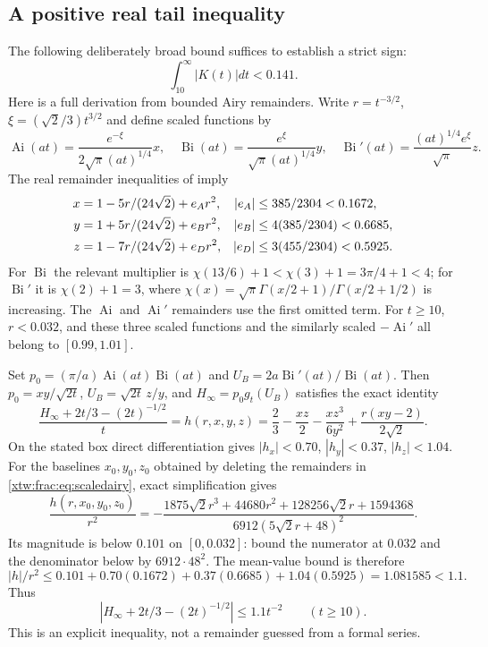 \documentclass[11pt]{article}
\theoremstyle{remark}\newtheorem{remark}[theorem]{Remark}
\newcommand{\Ai}{\operatorname{Ai}}
\newcommand{\Bi}{\operatorname{Bi}}
\begin{document}
\subsection{A positive real tail inequality}
The following deliberately broad bound suffices to establish a strict sign:
\begin{equation}\label{xtw:frac:eq:tail}
 \int_{10}^\infty|K(t)|dt<0.141.
\end{equation}
Here is a full derivation from bounded Airy remainders. Write
$r=t^{-3/2}$, $\xi=(\sqrt2/3)t^{3/2}$ and define scaled functions by
\[
 \Ai(at)=\frac{e^{-\xi}}{2\sqrt\pi(at)^{1/4}}x,\quad
 \Bi(at)=\frac{e^\xi}{\sqrt\pi(at)^{1/4}}y,\quad
 \Bi'(at)=\frac{(at)^{1/4}e^\xi}{\sqrt\pi}z.
\]
The real remainder inequalities of \cite{dlmf7} imply
\begin{align}
 x&=1-5r/(24\sqrt2)+e_A r^2,& |e_A|&\le385/2304<0.1672,\notag\\
 y&=1+5r/(24\sqrt2)+e_B r^2,& |e_B|&\le4(385/2304)<0.6685,\notag\\
 z&=1-7r/(24\sqrt2)+e_D r^2,& |e_D|&\le3(455/2304)<0.5925.
                                                        \label{xtw:frac:eq:scaledairy}
\end{align}
For $\Bi$ the relevant multiplier is
$\chi(13/6)+1<\chi(3)+1=3\pi/4+1<4$; for $\Bi'$ it is
$\chi(2)+1=3$, where
$\chi(x)=\sqrt\pi\Gamma(x/2+1)/\Gamma(x/2+1/2)$ is increasing.
The $\Ai$ and $\Ai'$ remainders use the first omitted term.
For $t\ge10$, $r<0.032$, and these three scaled functions and the
similarly scaled $-\Ai'$ all belong to $[0.99,1.01]$.

Set $p_0=(\pi/a)\Ai(at)\Bi(at)$ and
$U_B=2a\Bi'(at)/\Bi(at)$. Then
$p_0=xy/\sqrt{2t}$, $U_B=\sqrt{2t}\,z/y$, and
$H_\infty=p_0g_t(U_B)$ satisfies the exact identity
\[
 \frac{H_\infty+2t/3-(2t)^{-1/2}}t
 =h(r,x,y,z)=\frac23-\frac{xz}2-\frac{xz^3}{6y^2}
                                  +\frac{r(xy-2)}{2\sqrt2}.
\]
On the stated box direct differentiation gives
$|h_x|<0.70$, $|h_y|<0.37$, $|h_z|<1.04$.
For the baselines $x_0,y_0,z_0$ obtained by deleting the remainders
in \eqref{xtw:frac:eq:scaledairy}, exact simplification gives
\[
 \frac{h(r,x_0,y_0,z_0)}{r^2}
 =-\frac{1875\sqrt2r^3+44680r^2+128256\sqrt2r+1594368}
             {6912(5\sqrt2r+48)^2}.
\]
Its magnitude is below $0.101$ on $[0,0.032]$: bound the numerator
at $0.032$ and the denominator below by $6912\cdot48^2$.
The mean-value bound is therefore
\[
 |h|/r^2\le0.101+0.70(0.1672)+0.37(0.6685)+1.04(0.5925)
                 =1.081585<1.1.
\]
Thus
\begin{equation}\label{xtw:frac:eq:Htail}
 |H_\infty+2t/3-(2t)^{-1/2}|\le1.1t^{-2}\qquad(t\ge10).
\end{equation}
This is an explicit inequality, not a remainder guessed from a formal series.
\end{document}
